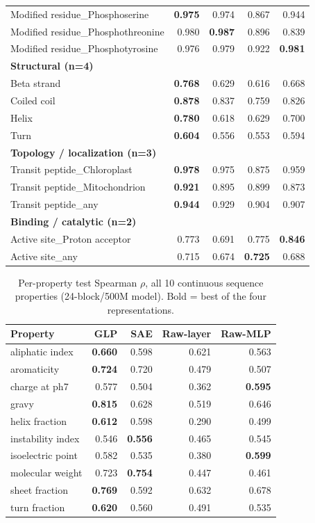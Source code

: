 \documentclass{article}
\begin{document}
\begin{longtable}{p{6.0cm}rrrr}
Modified residue\_Phosphoserine & \textbf{0.975} & 0.974 & 0.867 & 0.944 \\
Modified residue\_Phosphothreonine & 0.980 & \textbf{0.987} & 0.896 & 0.839 \\
Modified residue\_Phosphotyrosine & 0.976 & 0.979 & 0.922 & \textbf{0.981} \\
\multicolumn{5}{l}{\textbf{Structural (n=4)}} \\
Beta strand & \textbf{0.768} & 0.629 & 0.616 & 0.668 \\
Coiled coil & \textbf{0.878} & 0.837 & 0.759 & 0.826 \\
Helix & \textbf{0.780} & 0.618 & 0.629 & 0.700 \\
Turn & \textbf{0.604} & 0.556 & 0.553 & 0.594 \\
\multicolumn{5}{l}{\textbf{Topology / localization (n=3)}} \\
Transit peptide\_Chloroplast & \textbf{0.978} & 0.975 & 0.875 & 0.959 \\
Transit peptide\_Mitochondrion & \textbf{0.921} & 0.895 & 0.899 & 0.873 \\
Transit peptide\_any & \textbf{0.944} & 0.929 & 0.904 & 0.907 \\
\multicolumn{5}{l}{\textbf{Binding / catalytic (n=2)}} \\
Active site\_Proton acceptor & 0.773 & 0.691 & 0.775 & \textbf{0.846} \\
Active site\_any & 0.715 & 0.674 & \textbf{0.725} & 0.688 \\
\end{longtable}

\begin{table}[h]
\centering
\caption{Per-property test Spearman $\rho$, all 10 continuous sequence properties (24-block/500M model). Bold = best of the four representations.}
\label{tab:app-continuous}
\begin{tabular}{lrrrr}
\toprule
Property & GLP & SAE & Raw-layer & Raw-MLP \\
\midrule
aliphatic index & \textbf{0.660} & 0.598 & 0.621 & 0.563 \\
aromaticity & \textbf{0.724} & 0.720 & 0.479 & 0.507 \\
charge at ph7 & 0.577 & 0.504 & 0.362 & \textbf{0.595} \\
gravy & \textbf{0.815} & 0.628 & 0.519 & 0.646 \\
helix fraction & \textbf{0.612} & 0.598 & 0.290 & 0.499 \\
instability index & 0.546 & \textbf{0.556} & 0.465 & 0.545 \\
isoelectric point & 0.582 & 0.535 & 0.380 & \textbf{0.599} \\
molecular weight & 0.723 & \textbf{0.754} & 0.447 & 0.461 \\
sheet fraction & \textbf{0.769} & 0.592 & 0.632 & 0.678 \\
turn fraction & \textbf{0.620} & 0.560 & 0.491 & 0.535 \\
\bottomrule
\end{tabular}
\end{table}
\end{document}
